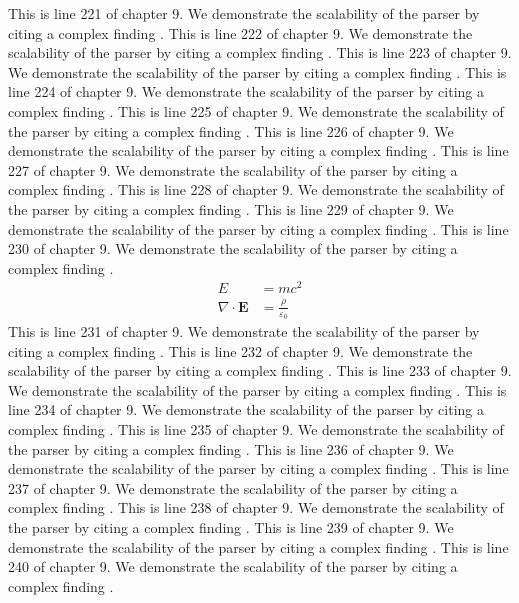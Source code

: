 This is line 221 of chapter 9. We demonstrate the scalability of the parser by citing a complex finding \cite{ref9_221}.
This is line 222 of chapter 9. We demonstrate the scalability of the parser by citing a complex finding \cite{ref9_222}.
This is line 223 of chapter 9. We demonstrate the scalability of the parser by citing a complex finding \cite{ref9_223}.
This is line 224 of chapter 9. We demonstrate the scalability of the parser by citing a complex finding \cite{ref9_224}.
This is line 225 of chapter 9. We demonstrate the scalability of the parser by citing a complex finding \cite{ref9_225}.
This is line 226 of chapter 9. We demonstrate the scalability of the parser by citing a complex finding \cite{ref9_226}.
This is line 227 of chapter 9. We demonstrate the scalability of the parser by citing a complex finding \cite{ref9_227}.
This is line 228 of chapter 9. We demonstrate the scalability of the parser by citing a complex finding \cite{ref9_228}.
This is line 229 of chapter 9. We demonstrate the scalability of the parser by citing a complex finding \cite{ref9_229}.
This is line 230 of chapter 9. We demonstrate the scalability of the parser by citing a complex finding \cite{ref9_230}.
\begin{align*}
  E &= mc^2 \\
  \nabla \cdot \mathbf{E} &= \frac{\rho}{\varepsilon_0}
\end{align*}
This is line 231 of chapter 9. We demonstrate the scalability of the parser by citing a complex finding \cite{ref9_231}.
This is line 232 of chapter 9. We demonstrate the scalability of the parser by citing a complex finding \cite{ref9_232}.
This is line 233 of chapter 9. We demonstrate the scalability of the parser by citing a complex finding \cite{ref9_233}.
This is line 234 of chapter 9. We demonstrate the scalability of the parser by citing a complex finding \cite{ref9_234}.
This is line 235 of chapter 9. We demonstrate the scalability of the parser by citing a complex finding \cite{ref9_235}.
This is line 236 of chapter 9. We demonstrate the scalability of the parser by citing a complex finding \cite{ref9_236}.
This is line 237 of chapter 9. We demonstrate the scalability of the parser by citing a complex finding \cite{ref9_237}.
This is line 238 of chapter 9. We demonstrate the scalability of the parser by citing a complex finding \cite{ref9_238}.
This is line 239 of chapter 9. We demonstrate the scalability of the parser by citing a complex finding \cite{ref9_239}.
This is line 240 of chapter 9. We demonstrate the scalability of the parser by citing a complex finding \cite{ref9_240}.
